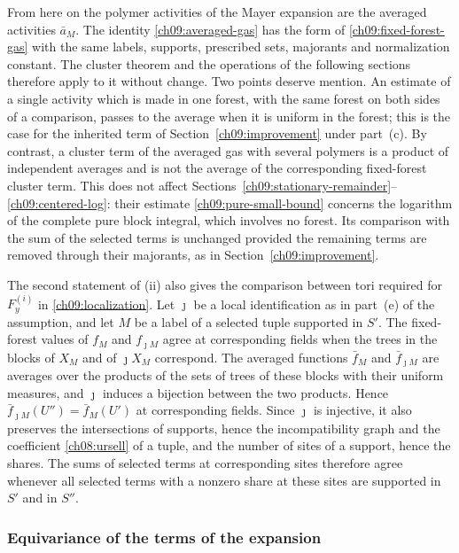 From here on the polymer activities of the Mayer expansion are the averaged activities
$\bar a_M$. The identity \eqref{ch09:averaged-gas} has the form of
\eqref{ch09:fixed-forest-gas} with the same labels, supports, prescribed
sets, majorants and normalization constant. The cluster theorem and the
operations of the following sections therefore apply to it without
change. Two points deserve mention. An estimate of a single activity
which is made in one forest, with the same forest on both sides of a
comparison, passes to the average when it is uniform in the forest;
this is the case for the inherited term of
Section~\ref{ch09:improvement} under part~(c). By contrast, a cluster
term of the averaged gas with several polymers is a product of
independent averages and is not the average of the corresponding
fixed-forest cluster term. This does not affect
Sections~\ref{ch09:stationary-remainder}--\ref{ch09:centered-log}:
their estimate \eqref{ch09:pure-small-bound} concerns the logarithm of
the complete pure block integral, which involves no forest. Its
comparison with the sum of the selected terms is unchanged provided the
remaining terms are removed through their majorants, as in
Section~\ref{ch09:improvement}.

The second statement of (ii) also gives the comparison between tori
required for $F_y^{(i)}$ in \eqref{ch09:localization}. Let $\jmath$ be
a local identification as in part~(e) of the assumption, and let $M$ be
a label of a selected tuple supported in $S'$. The fixed-forest values
of $f_M$ and $f_{\jmath M}$ agree at corresponding fields when the
trees in the blocks of $X_M$ and of $\jmath X_M$ correspond. The
averaged functions $\bar f_M$ and $\bar f_{\jmath M}$ are averages over
the products of the sets of trees of these blocks with their uniform
measures, and $\jmath$ induces a bijection between the two products.
Hence $\bar f_{\jmath M}(U'')=\bar f_M(U')$ at corresponding fields.
Since $\jmath$ is injective, it also preserves the intersections of
supports, hence the incompatibility graph and the coefficient
\eqref{ch08:ursell} of a tuple, and the number of sites of a support,
hence the shares. The sums of selected terms at corresponding sites
therefore agree whenever all selected terms with a nonzero share at
these sites are supported in $S'$ and in $S''$.

\subsubsection*{Equivariance of the terms of the expansion}

